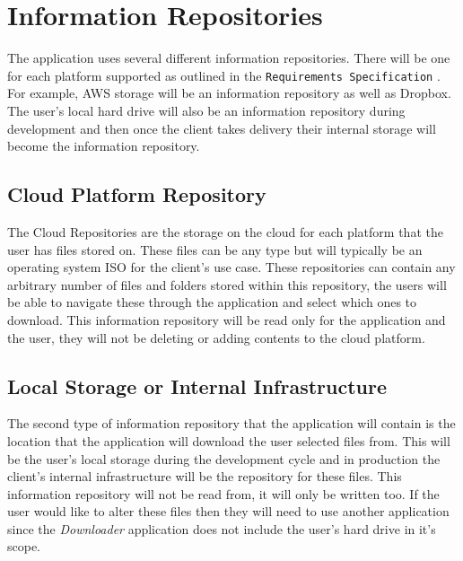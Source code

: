 \documentclass{article}
\begin{document}
\section{Information Repositories}
The application uses several different information repositories. There will be one for each platform supported as
outlined in the \texttt{Requirements Specification} \cite{reqs}. For example, AWS storage will be an information
repository as well as Dropbox. The user's local hard drive will also be an information repository during
development and then once the client takes delivery their internal storage will become the information repository.

    \subsection{Cloud Platform Repository}
    The Cloud Repositories are the storage on the cloud for each platform that the user has files stored on.
    These files can be any type but will typically be an operating system ISO for the client's use case. These
    repositories can contain any arbitrary number of files and folders stored within this repository, the users
    will be able to navigate these through the application and select which ones to download. This information repository
    will be read only for the application and the user, they will not be deleting or adding contents to the cloud platform.
    
    \subsection{Local Storage or Internal Infrastructure}
    The second type of information repository that the application will contain is the location that the
    application will download the user selected files from. This will be the user's local storage during the
    development cycle and in production the client's internal infrastructure will be the repository for these
    files. This information repository will not be read from, it will only be written too. If the user would like to alter
    these files then they will need to use another application since the \textit{Downloader} application does not
    include the user's hard drive in it's scope.
\end{document}
